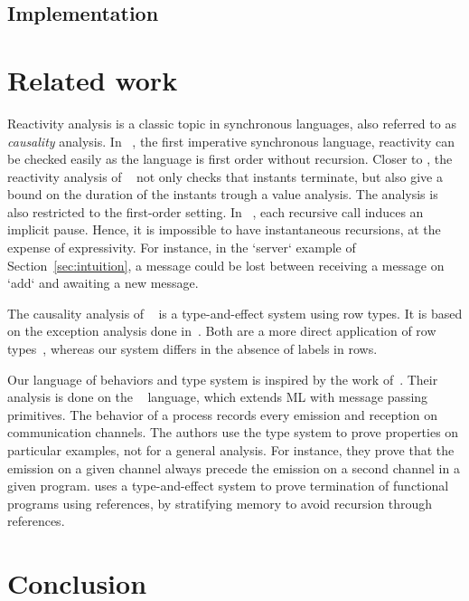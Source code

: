 \documentclass[9pt,preprint]{sigplanconf}
\begin{document}
\subsection{Implementation}

\section{Related work}
\label{sec:related_work}

Reactivity analysis is a classic topic in synchronous languages, also referred to as \emph{causality} analysis. In \esterel~\cite{Berry:1997}, the first imperative synchronous language, reactivity can be checked easily as the language is first order without recursion. Closer to \rml, the reactivity analysis of \funloft~\cite{Amadio:2007b} not only checks that instants terminate, but also give a bound on the duration of the instants trough a value analysis. The analysis is also restricted to the first-order setting. In \ulm~\cite{Boudol:2004}, each recursive call induces an implicit pause. Hence, it is impossible to have instantaneous recursions, at the expense of expressivity. For instance, in the `server` example of Section~\ref{sec:intuition}, a message could be lost between receiving a message on `add` and awaiting a new message.

The causality analysis of \lucy~\cite{Cuoq:2001} is a type-and-effect system using row types. It is based on the exception analysis done in~\cite{Leroy:2000}. Both are a more direct application of row types~\cite{Remy:1993}, whereas our system differs in the absence of labels in rows.


Our language of behaviors and type system is inspired by the work of~\cite{Amtoft:1999}. Their analysis is done on the \cml~\cite{Reppy:2007} language, which extends ML with message passing primitives. The behavior of a process records every emission and reception on communication channels. The authors use the type system to prove properties on particular examples, not for a general analysis. For instance, they prove that the emission on a given channel always precede the emission on a second channel in a given program. \cite{Boudol:2010} uses a type-and-effect system to prove termination of functional programs using references, by stratifying memory to avoid recursion through references.


\section{Conclusion}
\end{document}
